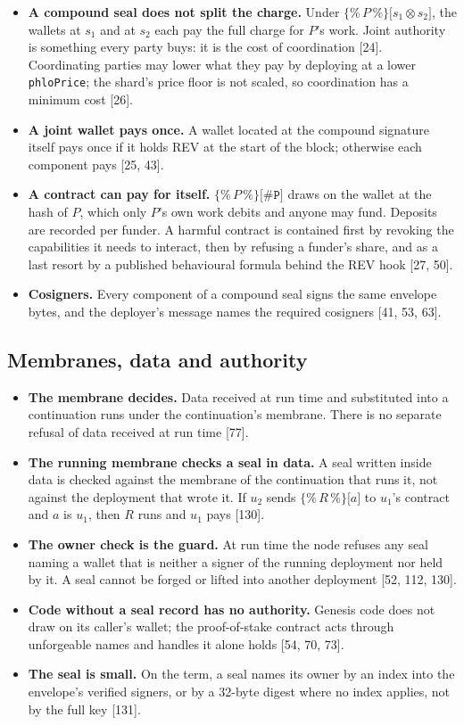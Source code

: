 \documentclass[10.5pt]{article}
\newcommand{\ob}{\texttt{\{\%}}
\newcommand{\cb}{\texttt{\%\}}}
\newcommand{\sealed}[2]{\ensuremath{\ob\,#1\,\cb\texttt{[}#2\texttt{]}}}
\newcommand{\code}[1]{\texttt{#1}}
\newcommand{\D}[1]{{\color{muted}\small[#1]}}
\begin{document}
\begin{itemize}
\item \textbf{A compound seal does not split the charge.} Under \sealed{P}{s_1 \otimes s_2}, the wallets at $s_1$ and at $s_2$ each pay the full charge for $P$'s work. Joint authority is something every party buys: it is the cost of coordination \D{24}. Coordinating parties may lower what they pay by deploying at a lower \code{phloPrice}; the shard's price floor is not scaled, so coordination has a minimum cost \D{26}.
\item \textbf{A joint wallet pays once.} A wallet located at the compound signature itself pays once if it holds REV at the start of the block; otherwise each component pays \D{25, 43}.
\item \textbf{A contract can pay for itself.} \sealed{P}{\code{\# P}} draws on the wallet at the hash of $P$, which only $P$'s own work debits and anyone may fund. Deposits are recorded per funder. A harmful contract is contained first by revoking the capabilities it needs to interact, then by refusing a funder's share, and as a last resort by a published behavioural formula behind the REV hook \D{27, 50}.
\item \textbf{Cosigners.} Every component of a compound seal signs the same envelope bytes, and the deployer's message names the required cosigners \D{41, 53, 63}.
\end{itemize}

\subsection{Membranes, data and authority}\label{sec:authority}

\begin{itemize}
\item \textbf{The membrane decides.} Data received at run time and substituted into a continuation runs under the continuation's membrane. There is no separate refusal of data received at run time \D{77}.
\item \textbf{The running membrane checks a seal in data.} A seal written inside data is checked against the membrane of the continuation that runs it, not against the deployment that wrote it. If $u_2$ sends \sealed{R}{a} to $u_1$'s contract and $a$ is $u_1$, then $R$ runs and $u_1$ pays \D{130}.
\item \textbf{The owner check is the guard.} At run time the node refuses any seal naming a wallet that is neither a signer of the running deployment nor held by it. A seal cannot be forged or lifted into another deployment \D{52, 112, 130}.
\item \textbf{Code without a seal record has no authority.} Genesis code does not draw on its caller's wallet; the proof-of-stake contract acts through unforgeable names and handles it alone holds \D{54, 70, 73}.
\item \textbf{The seal is small.} On the term, a seal names its owner by an index into the envelope's verified signers, or by a 32-byte digest where no index applies, not by the full key \D{131}.
\end{itemize}
\end{document}
